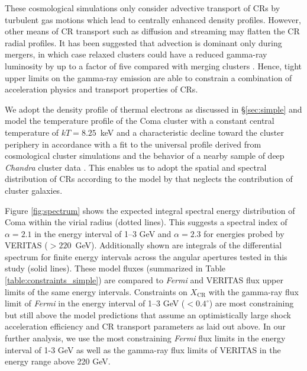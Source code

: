 \documentclass[12pt,manuscript]{aastex}
\def\Fermi{{\em Fermi}\xspace}
\newcommand{\CR}{\mathrm{CR}}
\begin{document}
These cosmological simulations only consider advective transport of CRs by turbulent gas motions
which lead to centrally enhanced density profiles.  However, other means of CR transport such as
diffusion and streaming may flatten the CR radial profiles. It has been suggested that advection is
dominant only during mergers, in which case relaxed clusters could have a reduced gamma-ray
luminosity by up to a factor of five compared with merging clusters
\citep{article:EnsslinPfrommerMiniatiSubramanian:2011}. Hence, tight upper limits on the gamma-ray
emission are able to constrain a combination of acceleration physics and transport properties of
CRs.

We adopt the density profile of thermal electrons as discussed in \S \ref{sec:simple} and model the
temperature profile
of the Coma cluster with a constant central temperature of $kT= 8.25$~keV and a characteristic
decline toward the cluster periphery in accordance with a fit to the universal profile derived from
cosmological cluster simulations \citep{article:PinzkePfrommer:2010, article:Pfrommer_etal:2007}
and the behavior of a nearby sample of deep {\em Chandra} cluster data
\citep{article:Vikhlinin_etal:2005}. This enables us to adopt the spatial and spectral distribution
of CRs according to the model by \citet{article:PinzkePfrommer:2010} that neglects the contribution
of cluster galaxies.

Figure \ref{fig:spectrum} shows the expected integral spectral energy distribution of Coma within
the virial radius (dotted lines). This suggests a spectral index of $\alpha=2.1$ in the energy
interval of 1--3 GeV and $\alpha=2.3$ for energies probed by VERITAS ($>220$~GeV). Additionally
shown are integrals of the differential spectrum for finite energy intervals across the angular
apertures tested in this study (solid lines). These model fluxes (summarized in Table
\ref{table:constraints_simple}) are compared to \Fermi and VERITAS flux upper limits of the same
energy intervals. Constraints on $X_\CR$ with the gamma-ray flux limit of \Fermi in the energy
interval of 1--3 GeV ($<0.4^\circ$) are most constraining but still above the model predictions that
assume an optimistically large shock acceleration efficiency and CR transport parameters as laid out
above. In our further analysis, we use the most constraining \Fermi flux limits in the energy
interval of 1-3 GeV as well as the gamma-ray flux limits of VERITAS in the energy range above 220
GeV.
\end{document}
